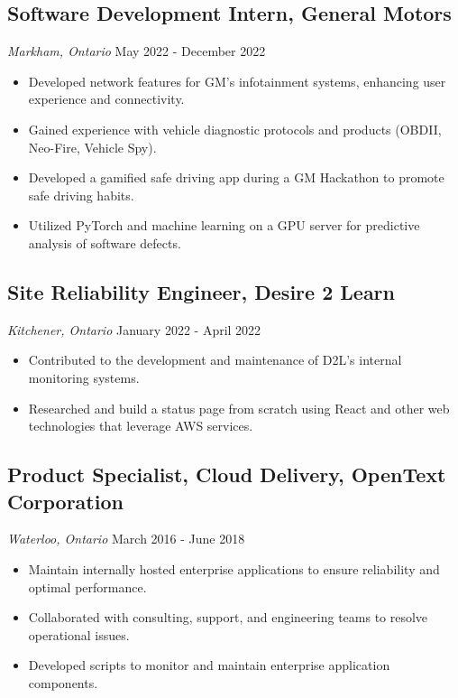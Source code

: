 \documentclass[a4paper,11pt]{article}  %
\begin{document}
\subsection*{Software Development Intern, General Motors}
\textit{Markham, Ontario} \hfill May 2022 - December 2022
\begin{itemize}
    \item Developed network features for GM’s infotainment systems, enhancing user experience and connectivity.
    \item Gained experience with vehicle diagnostic protocols and products (OBDII, Neo-Fire, Vehicle Spy).
    \item Developed a gamified safe driving app during a GM Hackathon to promote safe driving habits.
    \item Utilized PyTorch and machine learning on a GPU server for predictive analysis of software defects.
\end{itemize}

\subsection*{Site Reliability Engineer, Desire 2 Learn}
\textit{Kitchener, Ontario} \hfill January 2022 - April 2022
\begin{itemize}
    \item Contributed to the development and maintenance of D2L’s internal monitoring systems.
    \item Researched and build a status page from scratch using React and other web technologies that leverage AWS services.
\end{itemize}

\subsection*{Product Specialist, Cloud Delivery, OpenText Corporation}
\textit{Waterloo, Ontario} \hfill March 2016 - June 2018
\begin{itemize}
    \item Maintain internally hosted enterprise applications to ensure reliability and optimal performance.
    \item Collaborated with consulting, support, and engineering teams to resolve operational issues.
    \item Developed scripts to monitor and maintain enterprise application components.
\end{itemize}
\end{document}
